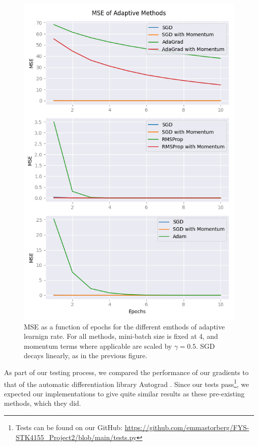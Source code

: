 \begin{figure}
    \centering
    \includegraphics[width=\linewidth]{figures/all_plots/MSEGD.png}
    \caption{MSE as a function of epochs for the different emthods of adaptive learnign rate. For all methods, mini-batch size is fixed at 4, and momentum terms where applicable are scaled by $\gamma = 0.5$. SGD decays linearly, as in the previous figure.}
    \label{fig:MSEGD}
\end{figure}

As part of our testing process, we compared the performance of our gradients to that of the automatic differentiation library Autograd \cite{autograd}. Since our tests pass\footnote{Tests can be found on our GitHub: \url{https://github.com/emmastorberg/FYS-STK4155_Project2/blob/main/tests.py}}, we expected our implementations to give quite similar results as these pre-existing methods, which they did. 

